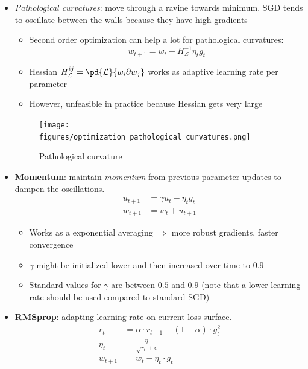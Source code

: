 \begin{itemize}
	\item \textit{Pathological curvatures}: move through a ravine towards minimum. SGD tends to oscillate between the walls because they have high gradients
	\begin{itemize}
		\item Second order optimization can help a lot for pathological curvatures: $$w_{t+1} = w_{t} - H_{\mathcal{L}}^{-1} \eta_t g_t$$
		\item Hessian $H_{\mathcal{L}}^{ij} = \pd{\mathcal{L}}{w_i\partial w_j}$ works as adaptive learning rate per parameter
		\item However, unfeasible in practice because Hessian gets very large
	\end{itemize}
	\begin{figure}[ht!]
		\centering
		\texttt{[image: figures/optimization\_pathological\_curvatures.png]}
		\caption{Pathological curvature}
		\label{fig:optimization_pathological_curvatures}
	\end{figure}
	\item \textbf{Momentum}: maintain \textit{momentum} from previous parameter updates to dampen the oscillations.
	\begin{equation*}
		\begin{split}
			u_{t+1} & = \gamma u_{t} - \eta_t g_t \\
			w_{t+1} & = w_{t} + u_{t+1}
		\end{split}
	\end{equation*}
	\begin{itemize}
		\item Works as a exponential averaging $\Rightarrow$ more robust gradients, faster convergence
		\item $\gamma$ might be initialized lower and then increased over time to $0.9$
		\item Standard values for $\gamma$ are between $0.5$ and $0.9$ (note that a lower learning rate should be used compared to standard SGD)
	\end{itemize}
	\item \textbf{RMSprop}: adapting learning rate on current loss surface.
	\begin{equation*}
		\begin{split}
			r_t & = \alpha \cdot r_{t-1} + \left(1 - \alpha\right) \cdot g_t^2\\
			\eta_t & = \frac{\eta}{\sqrt{r_t} + \epsilon} \\
			w_{t+1} & = w_{t} - \eta_t \cdot g_t\\

\end{split}
\end{equation*}
\end{itemize}

